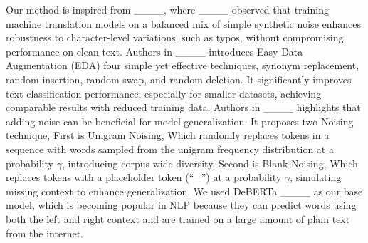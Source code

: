 Our method is inspired from ____, where ____ observed that training machine translation models on a balanced mix of simple synthetic noise enhances robustness to character-level variations, such as typos, without compromising performance on clean text. Authors in ____ introduces Easy Data Augmentation (EDA) four simple yet effective techniques, synonym replacement, random insertion, random swap, and random deletion. It significantly improves text classification performance, especially for smaller datasets, achieving comparable results with reduced training data.
Authors in ____ highlights that adding noise can be beneficial for model generalization. It proposes two Noising technique, First is Unigram Noising, Which randomly replaces tokens in a sequence with words sampled from the unigram frequency distribution at a probability \( \gamma \), introducing corpus-wide diversity. Second is Blank Noising, Which replaces tokens with a placeholder token (“\_”) at a probability \( \gamma \), simulating missing context to enhance generalization. We used DeBERTa ____ as our base model, which is becoming popular in NLP because they can predict words using both the left and right context and are trained on a large amount of plain text from the internet.